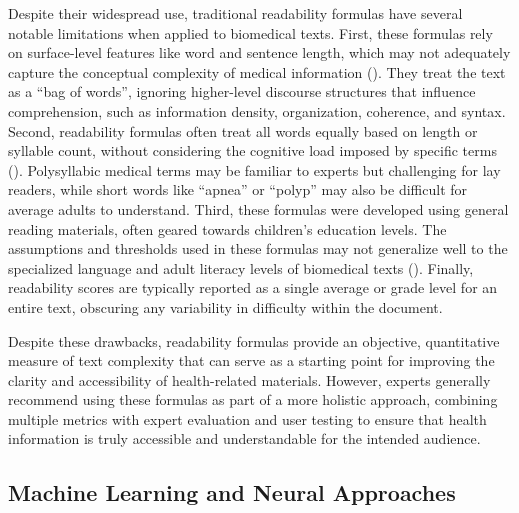 Despite their widespread use, traditional readability formulas have several notable limitations when applied to biomedical texts.
First, these formulas rely on surface-level features like word and sentence length, which may not adequately capture the conceptual complexity of medical information (\cite{Crossley2022, WANG2013503, Singh2024}).
They treat the text as a ``bag of words'', ignoring higher-level discourse structures that influence comprehension, such as information density, organization, coherence, and syntax. 
Second, readability formulas often treat all words equally based on length or syllable count, without considering the cognitive load imposed by specific terms (\cite{Swanson2024}).
Polysyllabic medical terms may be familiar to experts but challenging for lay readers, while short words like ``apnea'' or ``polyp'' may also be difficult for average adults to understand. 
Third, these formulas were developed using general reading materials, often geared towards children's education levels. The assumptions and thresholds used in these formulas may not generalize well to the specialized language and adult literacy levels of biomedical texts (\cite{Crossley2022}).
Finally, readability scores are typically reported as a single average or grade level for an entire text, obscuring any variability in difficulty within the document.

Despite these drawbacks, readability formulas provide an objective, quantitative measure of text complexity that can serve as a starting point for improving the clarity and accessibility of health-related materials. However, experts generally recommend using these formulas as part of a more holistic approach, combining multiple metrics with expert evaluation and user testing to ensure that health information is truly accessible and understandable for the intended audience.

\subsection{Machine Learning and Neural Approaches}

